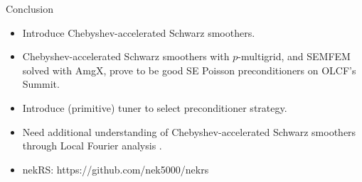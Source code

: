 \begin{frame}{Conclusion}
  \begin{itemize}
    \item Introduce Chebyshev-accelerated Schwarz smoothers.
    \item Chebyshev-accelerated Schwarz smoothers with $p$-multigrid, and SEMFEM solved with AmgX,
          prove to be good SE Poisson preconditioners on OLCF's Summit.
    \item Introduce (primitive) tuner to select preconditioner strategy.
    \item Need additional understanding of Chebyshev-accelerated Schwarz smoothers through Local Fourier analysis \cite{thompson2021local}.
    \item nekRS: https://github.com/nek5000/nekrs
  \end{itemize}
\end{frame}